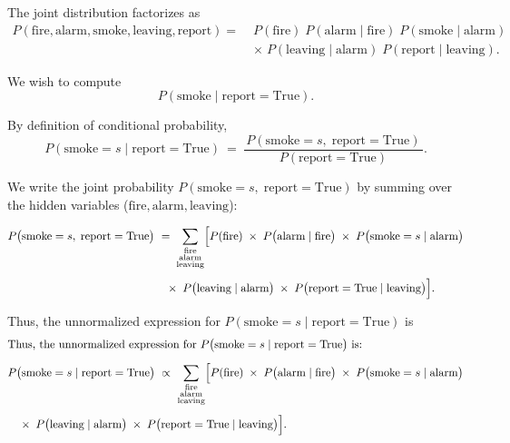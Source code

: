\documentclass[11pt]{article}
\begin{document}
The joint distribution factorizes as
\[
\begin{aligned}
P(\text{fire},\text{alarm},\text{smoke},\text{leaving},\text{report})
=\; & P(\text{fire}) \;P(\text{alarm}\mid\text{fire}) \;P(\text{smoke}\mid\text{alarm})\\[1mm]
&\times\; P(\text{leaving}\mid\text{alarm}) \;P(\text{report}\mid\text{leaving}).
\end{aligned}
\]

We wish to compute
\[
P(\text{smoke}\mid \text{report}=\text{True}).
\]


By definition of conditional probability,
\[
P(\text{smoke}=s \;\big|\; \text{report}=\text{True})
~=~
\frac{\,P(\text{smoke}=s,\;\text{report}=\text{True})\,}{\,P(\text{report}=\text{True})\,}.
\]

\noindent
We write the joint probability \(P(\text{smoke}=s,\;\text{report}=\text{True})\) by summing over the hidden variables (\(\text{fire}, \text{alarm}, \text{leaving}\)):

\[
\begin{aligned}
P\bigl(\text{smoke}=s,\;\text{report}=\text{True}\bigr)
&~=\;
\sum_{\substack{\text{fire}\\ \text{alarm}\\ \text{leaving}}}
\Bigl[
  P(\text{fire})
  \;\times\;
  P\bigl(\text{alarm}\mid \text{fire}\bigr)
  \;\times\;
  P\bigl(\text{smoke}=s \mid \text{alarm}\bigr)
  \\[4pt]
&\quad{}\times\;
  P\bigl(\text{leaving} \mid \text{alarm}\bigr)
  \;\times\;
  P\bigl(\text{report}=\text{True} \mid \text{leaving}\bigr)
\Bigr].
\end{aligned}
\]


Thus, the unnormalized expression for \(P(\text{smoke}=s\mid \text{report}=\text{True})\) is
\[
\begin{aligned}
&\text{Thus, the unnormalized expression for }
  P\bigl(\text{smoke}=s \mid \text{report}=\text{True}\bigr)
  \text{ is:}
\\[6pt]
&P\bigl(\text{smoke}=s \mid \text{report}=\text{True}\bigr)
~\propto~
\sum_{\substack{\text{fire}\\ \text{alarm}\\ \text{leaving}}}
\Bigl[
  P(\text{fire})
  \;\times\;
  P\bigl(\text{alarm}\mid \text{fire}\bigr)
  \;\times\;
  P\bigl(\text{smoke}=s\mid \text{alarm}\bigr)
  \\[4pt]
&\quad{}\times\;
  P\bigl(\text{leaving}\mid \text{alarm}\bigr)
  \;\times\;
  P\bigl(\text{report}=\text{True}\mid \text{leaving}\bigr)
\Bigr].
\end{aligned}
\]
\end{document}
